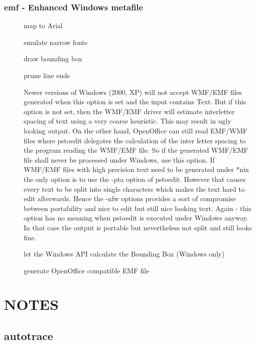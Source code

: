 \documentclass[english,a4paper]{article}
\begin{document}
\subsubsection{emf - Enhanced Windows metafile}
\begin{description}
\item[] 
map to Arial


\item[] 
emulate narrow fonts


\item[] 
draw bounding box


\item[] 
prune line ends


\item[] 
Newer versions of Windows (2000, XP) will not accept WMF/EMF files generated when this option is set and the input contains Text. But if this option is not set, then the WMF/EMF driver will estimate interletter spacing of text using a very coarse heuristic. This may result in ugly looking output. On the other hand, OpenOffice can still read EMF/WMF files where pstoedit delegates the calculation of the inter letter spacing to the program reading the WMF/EMF file. So if the generated WMF/EMF file shall never be processed under Windows, use this option. If WMF/EMF files with high precision text need to be generated under *nix the only option is to use the -pta option of pstoedit. However that causes every text to be split into single characters which makes the text hard to edit afterwards. Hence the -nfw options provides a sort of compromise between portability and nice to edit but still nice looking text. Again - this option has no meaning when pstoedit is executed under Windows anyway. In that case the output is portable but nevertheless not split and still looks fine.


\item[] 
let the Windows API calculate the Bounding Box (Windows only)


\item[] 
generate OpenOffice compatible EMF file


\end{description}

\section{NOTES}


  \subsection{autotrace}
\end{document}
